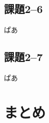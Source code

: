 \documentclass[12pt]{jarticle}
\begin{document}
\subsection{課題2–6}
\begin{shadebox}
    ぱあ
\end{shadebox}
\subsection{課題2–7}
\begin{shadebox}
    ぱあ
\end{shadebox}

\section{まとめ}


\begin{thebibliography}{99}
    \label{sannkoubunnkenn_chapter}
\end{thebibliography}

\clearpage
\appendix
\end{document}
